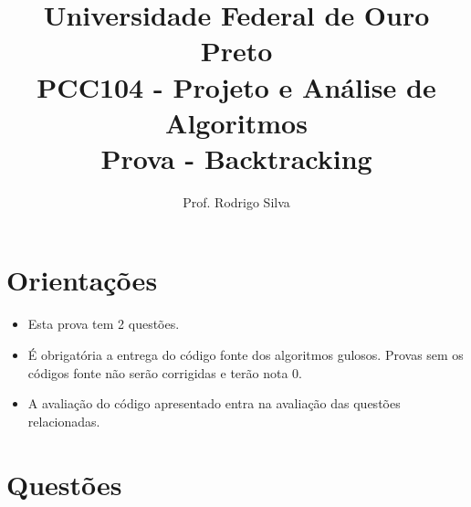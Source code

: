 \documentclass{article}
\title{\vspace{-2 cm}Universidade Federal de Ouro Preto \\ PCC104 - Projeto e Análise de Algoritmos \\ Prova - Backtracking}
\author{Prof. Rodrigo Silva}
\begin{document}
\maketitle

\section*{Orientações}

\begin{itemize}
    \item Esta prova tem 2 questões.
    \item É obrigatória a entrega do código fonte dos algoritmos gulosos. Provas sem os códigos fonte não serão corrigidas e terão nota 0.
    \item A avaliação do código apresentado entra na avaliação das questões relacionadas. 
\end{itemize}

\section*{Questões}
\end{document}

